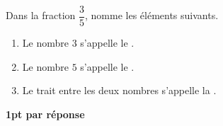 
\question[3]
Dans la fraction $\dfrac{3}{5}$, nomme les éléments suivants.

\vspace{10pt}
\begin{enumerate}[leftmargin=*,align=parleft, label=\alph*), itemsep=25pt]
\item Le nombre $3$ s'appelle le .
\item Le nombre $5$ s'appelle le .
\item Le trait entre les deux nombres s'appelle la .
\end{enumerate}

\begin{solution}[0pt]
\textbf{1pt par réponse}
\end{solution}